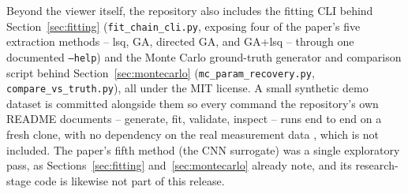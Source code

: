\documentclass[11pt]{article}
\begin{document}
Beyond the viewer itself, the repository also includes the fitting CLI
behind Section~\ref{sec:fitting} (\texttt{fit\_chain\_cli.py}, exposing
four of the paper's five extraction methods -- lsq, GA, directed GA, and
GA+lsq -- through one documented \texttt{--help}) and the Monte Carlo
ground-truth generator and comparison script behind
Section~\ref{sec:montecarlo} (\texttt{mc\_param\_recovery.py},
\texttt{compare\_vs\_truth.py}), all under the MIT license. A small
synthetic demo dataset is committed alongside them so every command the
repository's own README documents -- generate, fit, validate, inspect --
runs end to end on a fresh clone, with no dependency on the real
measurement data \cite{garcia2023temperature}, which is not included. The
paper's fifth method (the CNN surrogate) was a single exploratory pass,
as Sections~\ref{sec:fitting} and~\ref{sec:montecarlo} already note, and
its research-stage code is likewise not part of this release.



\end{document}
